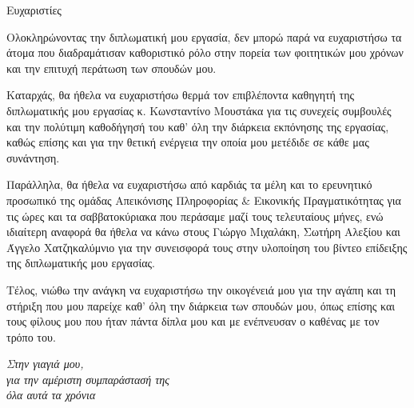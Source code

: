 \begin{center}
{\LARGE Ευχαριστίες}\\[1cm]
\end{center}

Ολοκληρώνοντας την διπλωματική μου εργασία, δεν μπορώ παρά να ευχαριστήσω τα άτομα που διαδραμάτισαν καθοριστικό ρόλο στην πορεία των φοιτητικών μου χρόνων και την επιτυχή περάτωση των σπουδών μου.

Καταρχάς, θα ήθελα να ευχαριστήσω θερμά τον επιβλέποντα καθηγητή της διπλωματικής μου εργασίας κ. Κωνσταντίνο Μουστάκα για τις συνεχείς συμβουλές και την πολύτιμη καθοδήγησή του καθ' όλη την διάρκεια εκπόνησης της εργασίας, καθώς επίσης και για την θετική ενέργεια την οποία μου μετέδιδε σε κάθε μας συνάντηση.

Παράλληλα, θα ήθελα να ευχαριστήσω από καρδιάς τα μέλη και το ερευνητικό προσωπικό της ομάδας Απεικόνισης Πληροφορίας \& Εικονικής Πραγματικότητας για τις ώρες και τα σαββατοκύριακα που περάσαμε μαζί τους τελευταίους μήνες, ενώ ιδιαίτερη αναφορά θα ήθελα να κάνω στους Γιώργο Μιχαλάκη, Σωτήρη Αλεξίου και Άγγελο Χατζηκαλύμνιο για την συνεισφορά τους στην υλοποίηση του βίντεο επίδειξης της διπλωματικής μου εργασίας.

Τέλος, νιώθω την ανάγκη να ευχαριστήσω την οικογένειά μου για την αγάπη και τη στήριξη που μου παρείχε καθ' όλη την διάρκεια των σπουδών μου, όπως επίσης και τους φίλους μου που ήταν πάντα δίπλα μου και με ενέπνευσαν ο καθένας με τον τρόπο του.\\[2cm]

\begin{flushright}
    \emph{Στην γιαγιά μου,\\
    για την αμέριστη συμπαράστασή της\\
    όλα αυτά τα χρόνια}
\end{flushright}